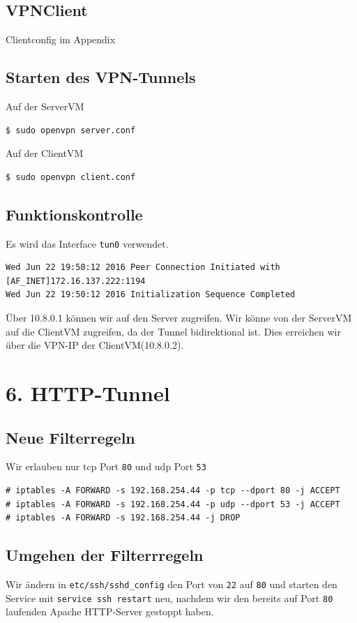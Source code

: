 \documentclass[10pt,a4paper]{article}
\begin{document}
\subsection{VPNClient}
Clientconfig im Appendix

\subsection{Starten des VPN-Tunnels}
Auf der ServerVM
\begin{verbatim}
$ sudo openvpn server.conf
\end{verbatim}
Auf der ClientVM
\begin{verbatim}
$ sudo openvpn client.conf
\end{verbatim}

\subsection{Funktionskontrolle}
Es wird das Interface \texttt{tun0} verwendet.
\begin{verbatim}
Wed Jun 22 19:50:12 2016 Peer Connection Initiated with [AF_INET]172.16.137.222:1194
Wed Jun 22 19:50:12 2016 Initialization Sequence Completed
\end{verbatim}
Über 10.8.0.1 können wir auf den Server zugreifen.
Wir könne von der ServerVM auf die ClientVM zugreifen, da der Tunnel bidirektional ist. Dies erreichen wir über die VPN-IP der ClientVM(10.8.0.2).
\setcounter{section}{6}
\section*{6. HTTP-Tunnel}
\setcounter{subsection}{0}
\subsection{Neue Filterregeln}
Wir erlauben nur tcp Port \texttt{80} und udp Port \texttt{53}
\begin{verbatim}
# iptables -A FORWARD -s 192.168.254.44 -p tcp --dport 80 -j ACCEPT
# iptables -A FORWARD -s 192.168.254.44 -p udp --dport 53 -j ACCEPT
# iptables -A FORWARD -s 192.168.254.44 -j DROP
\end{verbatim}

\subsection{Umgehen der Filterrregeln}
Wir ändern in \texttt{etc/ssh/sshd\_config} den Port von \texttt{22} auf \texttt{80} und starten den Service mit \texttt{service ssh restart} neu, nachdem wir den bereits auf Port \texttt{80} laufenden Apache HTTP-Server gestoppt haben.
\end{document}
